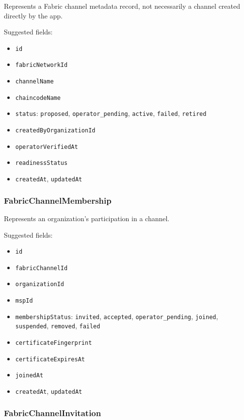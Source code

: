 Represents a Fabric channel metadata record, not necessarily a channel created directly by the app.

Suggested fields:

\begin{itemize}
  \item \texttt{id}
  \item \texttt{fabricNetworkId}
  \item \texttt{channelName}
  \item \texttt{chaincodeName}
  \item \texttt{status}: \texttt{proposed}, \texttt{operator\_pending}, \texttt{active}, \texttt{failed}, \texttt{retired}
  \item \texttt{createdByOrganizationId}
  \item \texttt{operatorVerifiedAt}
  \item \texttt{readinessStatus}
  \item \texttt{createdAt}, \texttt{updatedAt}
\end{itemize}

\subsubsection{FabricChannelMembership}

Represents an organization's participation in a channel.

Suggested fields:

\begin{itemize}
  \item \texttt{id}
  \item \texttt{fabricChannelId}
  \item \texttt{organizationId}
  \item \texttt{mspId}
  \item \texttt{membershipStatus}: \texttt{invited}, \texttt{accepted}, \texttt{operator\_pending}, \texttt{joined}, \texttt{suspended}, \texttt{removed}, \texttt{failed}
  \item \texttt{certificateFingerprint}
  \item \texttt{certificateExpiresAt}
  \item \texttt{joinedAt}
  \item \texttt{createdAt}, \texttt{updatedAt}
\end{itemize}

\subsubsection{FabricChannelInvitation}

